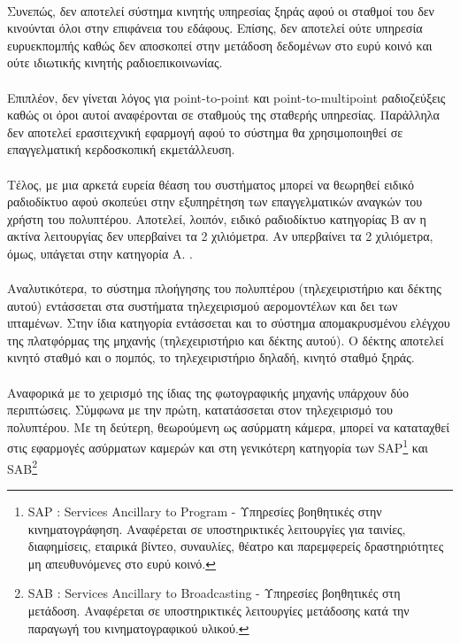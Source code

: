 \documentclass[a4paper, 12pt, twoside]{report}
\begin{document}
{{{{{{			\paragraph{}{Συνεπώς, δεν αποτελεί σύστημα κινητής υπηρεσίας ξηράς αφού οι σταθμοί του δεν κινούνται όλοι στην επιφάνεια του εδάφους. Επίσης, δεν αποτελεί ούτε υπηρεσία ευρυεκπομπής καθώς δεν αποσκοπεί στην μετάδοση δεδομένων στο ευρύ κοινό και ούτε ιδιωτικής κινητής ραδιοεπικοινωνίας.
			}
			\paragraph{}{Επιπλέον, δεν γίνεται λόγος για point-to-point και point-to-multipoint ραδιοζεύξεις καθώς οι όροι αυτοί αναφέρονται σε σταθμούς της σταθερής υπηρεσίας. Παράλληλα δεν αποτελεί ερασιτεχνική εφαρμογή αφού το σύστημα θα χρησιμοποιηθεί σε επαγγελματική κερδοσκοπική εκμετάλλευση.
			}
			\paragraph{}{Τέλος, με μια αρκετά ευρεία θέαση του συστήματος μπορεί να θεωρηθεί ειδικό ραδιοδίκτυο αφού σκοπεύει στην εξυπηρέτηση των επαγγελματικών αναγκών του χρήστη του πολυπτέρου. Αποτελεί, λοιπόν, ειδικό ραδιοδίκτυο κατηγορίας Β αν η ακτίνα λειτουργίας δεν υπερβαίνει τα 2 χιλιόμετρα. Αν υπερβαίνει τα 2 χιλιόμετρα, όμως, υπάγεται στην κατηγορία Α. \cite{ΦΕΚ2006Β750}.
			}
			\paragraph{}{Αναλυτικότερα, το σύστημα πλοήγησης του πολυπτέρου (τηλεχειριστήριο και δέκτης αυτού) εντάσσεται στα συστήματα τηλεχειρισμού αερομοντέλων και δει των ιπταμένων. Στην ίδια κατηγορία εντάσσεται και το σύστημα απομακρυσμένου ελέγχου της πλατφόρμας της μηχανής (τηλεχειριστήριο και δέκτης αυτού). Ο δέκτης αποτελεί κινητό σταθμό και ο πομπός, το τηλεχειριστήριο δηλαδή,  κινητό σταθμό ξηράς.
			}
			\paragraph{}{Αναφορικά με το χειρισμό της ίδιας της φωτογραφικής μηχανής υπάρχουν δύο περιπτώσεις. Σύμφωνα με την πρώτη, κατατάσσεται στον τηλεχειρισμό του πολυπτέρου. Με τη δεύτερη, θεωρούμενη ως ασύρματη κάμερα, μπορεί να καταταχθεί στις εφαρμογές ασύρματων καμερών και στη γενικότερη κατηγορία των SAP\footnote{SAP : Services Ancillary to Program - Υπηρεσίες βοηθητικές στην κινηματογράφηση. Αναφέρεται σε υποστηρικτικές λειτουργίες για ταινίες, διαφημίσεις, εταιρικά βίντεο, συναυλίες, θέατρο και παρεμφερείς δραστηριότητες μη απευθυνόμενες στο ευρύ κοινό.} και SAB\footnote{SAB : Services Ancillary to Broadcasting - Υπηρεσίες βοηθητικές στη μετάδοση. Αναφέρεται σε υποστηρικτικές λειτουργίες μετάδοσης κατά την παραγωγή του κινηματογραφικού υλικού.}
			}			
}}}}}}
\end{document}
